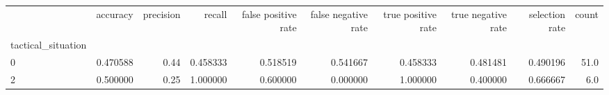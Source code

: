 \begin{tabular}{lrrrrrrrrr}
\toprule
{} &  accuracy &  precision &    recall &  false positive rate &  false negative rate &  true positive rate &  true negative rate &  selection rate &  count \\
tactical\_situation &           &            &           &                      &                      &                     &                     &                 &        \\
\midrule
0                  &  0.470588 &       0.44 &  0.458333 &             0.518519 &             0.541667 &            0.458333 &            0.481481 &        0.490196 &   51.0 \\
2                  &  0.500000 &       0.25 &  1.000000 &             0.600000 &             0.000000 &            1.000000 &            0.400000 &        0.666667 &    6.0 \\
\bottomrule
\end{tabular}
